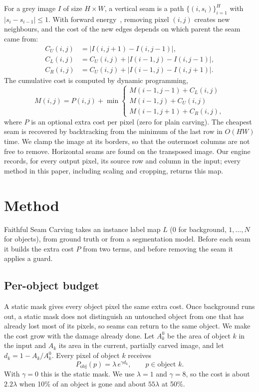 \documentclass[conference]{IEEEtran}
\newcommand{\ours}{Faithful Seam Carving}
\begin{document}
For a grey image $I$ of size $H\times W$, a vertical seam is a path $\{(i, s_i)\}_{i=1}^{H}$ with $|s_i - s_{i-1}|\le 1$. With forward energy~\cite{rubinstein2008improved}, removing pixel $(i,j)$ creates new neighbours, and the cost of the new edges depends on which parent the seam came from:
\begin{align}
C_U(i,j) &= |I(i,j{+}1) - I(i,j{-}1)|,\nonumber\\
C_L(i,j) &= C_U(i,j) + |I(i{-}1,j) - I(i,j{-}1)|,\\
C_R(i,j) &= C_U(i,j) + |I(i{-}1,j) - I(i,j{+}1)|.\nonumber
\end{align}
The cumulative cost is computed by dynamic programming,
\begin{equation}
M(i,j) = P(i,j) + \min\begin{cases}
M(i{-}1,j{-}1) + C_L(i,j)\\
M(i{-}1,j) + C_U(i,j)\\
M(i{-}1,j{+}1) + C_R(i,j),
\end{cases}
\end{equation}
where $P$ is an optional extra cost per pixel (zero for plain carving). The cheapest seam is recovered by backtracking from the minimum of the last row in $O(HW)$ time. We clamp the image at its borders, so that the outermost columns are not free to remove. Horizontal seams are found on the transposed image. Our engine records, for every output pixel, its source row and column in the input; every method in this paper, including scaling and cropping, returns this map.

\section{Method}

\ours{} takes an instance label map $L$ (0 for background, $1,\dots,N$ for objects), from ground truth or from a segmentation model. Before each seam it builds the extra cost $P$ from two terms, and before removing the seam it applies a guard.

\subsection{Per-object budget}
A static mask gives every object pixel the same extra cost. Once background runs out, a static mask does not distinguish an untouched object from one that has already lost most of its pixels, so seams can return to the same object. We make the cost grow with the damage already done. Let $A_k^0$ be the area of object $k$ in the input and $A_k$ its area in the current, partially carved image, and let $d_k = 1 - A_k/A_k^0$. Every pixel of object $k$ receives
\begin{equation}
P_{\text{obj}}(p) = \lambda\, e^{\gamma d_k}, \qquad p \in \text{object } k.
\end{equation}
With $\gamma = 0$ this is the static mask. We use $\lambda=1$ and $\gamma=8$, so the cost is about $2.2\lambda$ when 10\% of an object is gone and about $55\lambda$ at 50\%.
\end{document}
